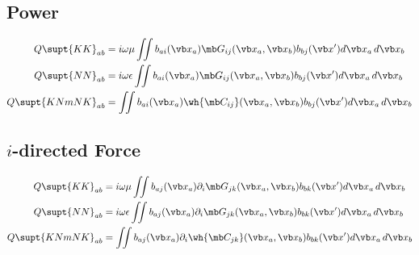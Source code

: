 \subsection*{Power}

\begin{align*}
 Q\supt{KK}_{ab}
&=i\omega \mu 
  \iint b_{ai}(\vb x_a) \mb G_{ij}(\vb x_a, \vb x_b) b_{bj}(\vb x^\prime) 
  d\vb x_a \, d\vb x_b
\\
 Q\supt{NN}_{ab}
&=i\omega \epsilon
  \iint b_{ai}(\vb x_a) \mb G_{ij}(\vb x_a, \vb x_b) b_{bj}(\vb x^\prime) 
  d\vb x_a \, d\vb x_b
\\
 Q\supt{KNmNK}_{ab}
&=
  \iint b_{ai}(\vb x_a) \wh{\mb C_{ij}}(\vb x_a, \vb x_b) b_{bj}(\vb x^\prime) 
  d\vb x_a \, d\vb x_b
\\
\end{align*}

\subsection*{$i$-directed Force}

\begin{align*}
 Q\supt{KK}_{ab}
&=i\omega \mu 
  \iint b_{aj}(\vb x_a) \partial_i \mb G_{jk}(\vb x_a, \vb x_b) b_{bk}(\vb x^\prime) 
  d\vb x_a \, d\vb x_b
\\
 Q\supt{NN}_{ab}
&=i\omega \epsilon
  \iint b_{aj}(\vb x_a) \partial_i \mb G_{jk}(\vb x_a, \vb x_b) b_{bk}(\vb x^\prime) 
  d\vb x_a \, d\vb x_b
\\
 Q\supt{KNmNK}_{ab}
&=
  \iint b_{aj}(\vb x_a) \partial_i \wh{\mb C_{jk}}(\vb x_a, \vb x_b) b_{bk}(\vb x^\prime) 
  d\vb x_a \, d\vb x_b
\\
\end{align*}

